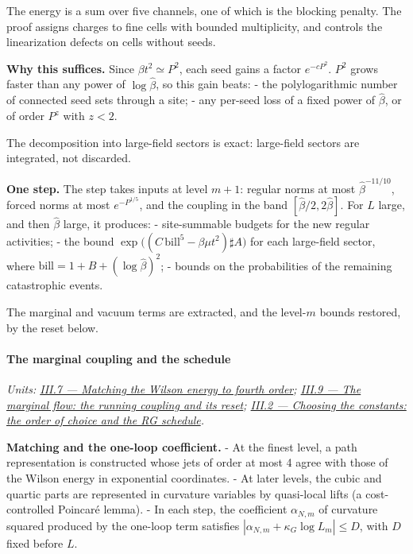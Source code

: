 \documentclass[
  letterpaper,
  11pt]{article}
\begin{document}
The energy is a sum over five channels, one of which is the blocking
penalty. The proof assigns charges to fine cells with bounded
multiplicity, and controls the linearization defects on cells without
seeds.

\textbf{Why this suffices.} Since \(\beta t^2\simeq P^2\), each seed
gains a factor \(e^{-cP^2}\). \(P^2\) grows faster than any power of
\(\log\hat\beta\), so this gain beats: - the polylogarithmic number of
connected seed sets through a site; - any per-seed loss of a fixed power
of \(\hat\beta\), or of order \(P^z\) with \(z<2\).

The decomposition into large-field sectors is exact: large-field sectors
are integrated, not discarded.

\textbf{One step.} The step takes inputs at level \(m+1\): regular norms
at most \(\hat\beta^{-11/10}\), forced norms at most \(e^{-P^{1/5}}\),
and the coupling in the band \([\hat\beta/2,2\hat\beta]\). For \(L\)
large, and then \(\hat\beta\) large, it produces: - site-summable
budgets for the new regular activities; - the bound
\(\exp\big((C\,\mathrm{bill}^5-\beta\mu t^2)\sharp A\big)\) for each
large-field sector, where \(\mathrm{bill}=1+B+(\log\hat\beta)^2\); -
bounds on the probabilities of the remaining catastrophic events.

The marginal and vacuum terms are extracted, and the level-\(m\) bounds
restored, by the reset below.

\paragraph{The marginal coupling and the
schedule}\label{the-marginal-coupling-and-the-schedule}

\emph{Units:
\href{https://github.com/scottnarmstrong/yang-mills-informalization/blob/main/outline/units/III-7.md}{III.7
--- Matching the Wilson energy to fourth order};
\href{https://github.com/scottnarmstrong/yang-mills-informalization/blob/main/outline/units/III-9.md}{III.9
--- The marginal flow: the running coupling and its reset};
\href{https://github.com/scottnarmstrong/yang-mills-informalization/blob/main/outline/units/III-2.md}{III.2
--- Choosing the constants: the order of choice and the RG schedule}.}

\textbf{Matching and the one-loop coefficient.} - At the finest level, a
path representation is constructed whose jets of order at most 4 agree
with those of the Wilson energy in exponential coordinates. - At later
levels, the cubic and quartic parts are represented in curvature
variables by quasi-local lifts (a cost-controlled Poincaré lemma). - In
each step, the coefficient \(\alpha_{N,m}\) of curvature squared
produced by the one-loop term satisfies
\(|\alpha_{N,m}+\kappa_G\log L_m|\le D\), with \(D\) fixed before \(L\).
\end{document}
